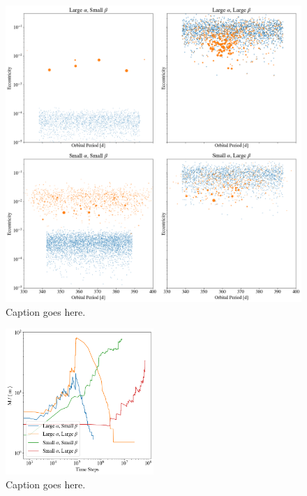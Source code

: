 \documentclass[onecolumn]{aastex63}
\begin{document}
\begin{figure}
\begin{center}
    \includegraphics[width=\textwidth]{figures/alpha_beta.png}
    \caption{Caption goes here.\label{fig:alpha_beta}}
\end{center}
\end{figure}

\begin{figure}
\begin{center}
    \includegraphics[width=0.5\textwidth]{figures/alpha_beta_evo.png}
    \caption{Caption goes here.\label{fig:alpha_beta_evo}}
\end{center}
\end{figure}
\end{document}
